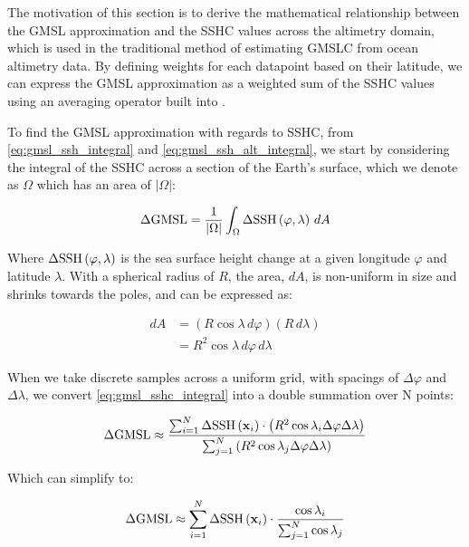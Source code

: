 The motivation of this section is to derive the mathematical relationship between the GMSL approximation and the SSHC values across the altimetry domain, which is used in the traditional method of estimating GMSLC from ocean altimetry data. By defining weights for each datapoint based on their latitude, we can express the GMSL approximation as a weighted sum of the SSHC values using an averaging operator built into .

To find the GMSL approximation with regards to SSHC, from \autoref{eq:gmsl_ssh_integral} and \autoref{eq:gmsl_ssh_alt_integral}, we start by considering the integral of the SSHC across a section of the Earth's surface, which we denote as $\Omega$ which has an area of $|\Omega|$:


\begin{equation}
    \Delta \mathrm{GMSL} = \dfrac{1}{|\Omega|}\int_\Omega \Delta \mathrm{SSH}\left(\varphi, \lambda\right) \, dA \label{eq:gmsl_sshc_integral}
\end{equation}

Where $\Delta \mathrm{SSH}\left(\varphi, \lambda\right)$ is the sea surface height change at a given longitude $\varphi$ and latitude $\lambda$. With a spherical radius of $R$, the area, $dA$, is non-uniform in size and shrinks towards the poles, and can be expressed as:

\begin{align}
    dA &= \left(R\cos \lambda \, d\varphi\right)\left(R \, d\lambda\right) \\
    &= R^2 \cos \lambda \, d\varphi \, d\lambda
\end{align}

When we take discrete samples across a uniform grid, with spacings of $\Delta \varphi$ and $\Delta \lambda$, we convert \autoref{eq:gmsl_sshc_integral} into a double summation over N points:

\begin{equation}
  \Delta \mathrm{GMSL} \approx \dfrac{\sum^N_{i=1}\Delta \mathrm{SSH}\left(\mathbf{x}_i\right)\cdot\left(R^2\cos \lambda_i \Delta \varphi \Delta \lambda\right)}{\sum^N_{j=1}\left(R^2 \cos \lambda_j\Delta \varphi\Delta \lambda\right)}
\end{equation}

Which can simplify to:

\begin{equation}
  \Delta \mathrm{GMSL} \approx \sum^N_{i=1}\Delta \mathrm{SSH}\left(\mathbf{x}_i\right)\cdot\dfrac{\cos \lambda_i}{\sum^N_{j=1}\cos \lambda_j}
\end{equation}

